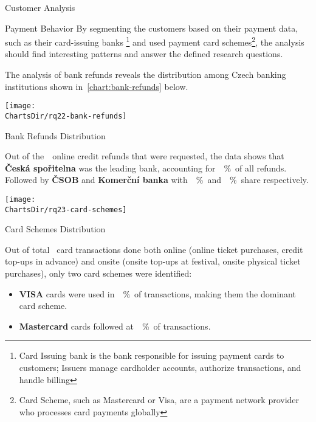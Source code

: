\begin{section}{Customer Analysis}
\begin{subsection}{Payment Behavior}
		By segmenting the customers based on their payment data,
		such as their card-issuing banks
		\footnote{Card Issuing bank is the bank responsible for issuing payment cards to customers; Issuers manage cardholder accounts, authorize transactions, and handle billing\cite{jc_what_are_card_schemes_and_how_do_they_work}} and used
		payment card schemes\footnote{Card Scheme, such as Mastercard or Visa, are a payment network provider who processes card payments globally\cite{jc_what_are_card_schemes_and_how_do_they_work}}, the analysis should find interesting
		patterns and answer the defined research questions.


		The analysis of bank refunds reveals the distribution among Czech banking institutions shown in~\autoref{chart:bank-refunds} below.

		\begin{chart}[h]
			\centering
			\texttt{[image: \\ChartsDir/rq22-bank-refunds]}
			\caption{ Bank Refunds Distribution}
			\label{chart:bank-refunds}
			\source
		\end{chart}

		Out of the~~online credit refunds that were requested, the data shows that \textbf{Česká spořitelna} was the leading bank, accounting for~~\%~of all refunds.
		Followed by \textbf{ČSOB} and \textbf{Komerční banka} with~~\%~and~~\%~share respectively.


		\begin{chart}[h]
			\centering
			\texttt{[image: \\ChartsDir/rq23-card-schemes]}
			\caption{ Card Schemes Distribution}
			\label{chart:card-schemes}
			\source
		\end{chart}

		Out of total ~card transactions done both online (online ticket purchases, credit top-ups in advance) and onsite (onsite top-ups at festival, onsite physical ticket purchases), only two card schemes were identified:
		\begin{itemize}
			\item \textbf{VISA} cards were used in~~\%~of transactions, making them the dominant card scheme.
			\item \textbf{Mastercard} cards followed at~~\%~of transactions.
		\end{itemize}


\end{subsection}
\end{section}
